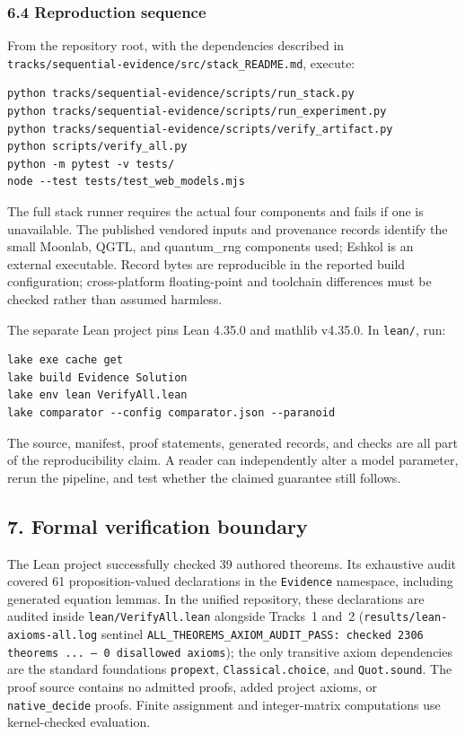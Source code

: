 \documentclass[10pt,a4paper]{article}
\begin{document}
\subsubsection{6.4 Reproduction sequence}\label{reproduction-sequence}

From the repository root, with the dependencies described in
\nolinkurl{tracks/sequential-evidence/src/stack_README.md}, execute:

\begin{verbatim}
python tracks/sequential-evidence/scripts/run_stack.py
python tracks/sequential-evidence/scripts/run_experiment.py
python tracks/sequential-evidence/scripts/verify_artifact.py
python scripts/verify_all.py
python -m pytest -v tests/
node --test tests/test_web_models.mjs
\end{verbatim}

The full stack runner requires the actual four components and fails if
one is unavailable. The published vendored inputs and provenance records
identify the small Moonlab, QGTL, and quantum\_rng components used;
Eshkol is an external executable. Record bytes are reproducible in the
reported build configuration; cross-platform floating-point and
toolchain differences must be checked rather than assumed harmless.

The separate Lean project pins Lean 4.35.0 and mathlib v4.35.0. In
\texttt{lean/}, run:

\begin{verbatim}
lake exe cache get
lake build Evidence Solution
lake env lean VerifyAll.lean
lake comparator --config comparator.json --paranoid
\end{verbatim}

The source, manifest, proof statements, generated records, and checks
are all part of the reproducibility claim. A reader can independently
alter a model parameter, rerun the pipeline, and test whether the
claimed guarantee still follows.

\subsection{7. Formal verification
boundary}\label{formal-verification-boundary}

The Lean project successfully checked 39 authored theorems. Its
exhaustive audit covered 61 proposition-valued declarations in the
\texttt{Evidence} namespace, including generated equation lemmas. In the
unified repository, these declarations are audited inside
\texttt{lean/VerifyAll.lean} alongside Tracks~1 and~2
(\texttt{results/lean-axioms-all.log} sentinel
\texttt{ALL\_THEOREMS\_AXIOM\_AUDIT\_PASS: checked 2306 theorems ... --- 0 disallowed axioms});
the only transitive axiom dependencies
are the standard foundations \texttt{propext},
\texttt{Classical.choice}, and \texttt{Quot.sound}. The proof source
contains no admitted proofs, added project axioms, or
\texttt{native\_decide} proofs. Finite assignment and integer-matrix
computations use kernel-checked evaluation.
\end{document}

